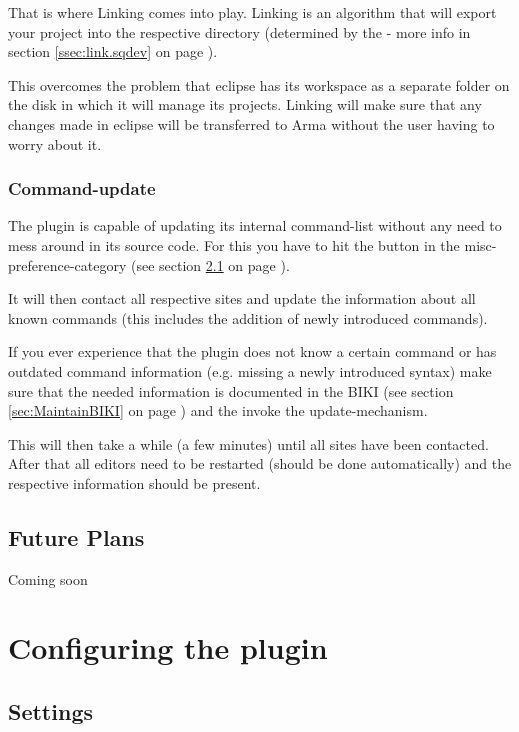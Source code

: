 \documentclass[twoside=false]{scrbook}
\newcommand{\arma}{Arma\xspace}
\begin{document}
	That is where Linking comes into play. Linking is an algorithm that will export your project into the respective directory (determined by the  - more info in section \ref{ssec:link.sqdev} on page \pageref{ssec:link.sqdev}).
	
	This overcomes the problem that eclipse has its workspace as a separate folder on the disk in which it will manage its projects. Linking will make sure that any changes made in eclipse will be transferred to \arma without the user having to worry about it.
	
	
	\subsection{Command-update}
	\label{ssec:CommandUpdate}
	The plugin is capable of updating its internal command-list without any need to mess around in its source code. For this you have to hit the  button in the misc-preference-category (see section \ref{sec:Settings} on page \pageref{sec:Settings}).
	
	It will then contact all respective sites and update the information about all known commands (this includes the addition of newly introduced commands).
	
	If you ever experience that the plugin does not know a certain command or has outdated command information (e.g. missing a newly introduced syntax) make sure that the needed information is documented in the BIKI (see section \ref{sec:MaintainBIKI} on page \pageref{sec:MaintainBIKI}) and the invoke the update-mechanism.
	
	This will then take a while (a few minutes) until all sites have been contacted. After that all editors need to be restarted (should be done automatically) and the respective information should be present.
	
	
	\section{Future Plans}
	\label{sec:FuturePlans}
	Coming soon
	
	
	
	\chapter{Configuring the plugin}
	\label{ch:ConfiguringThePlugin}
	
	\section{Settings}
	\label{sec:Settings}
	
\end{document}
